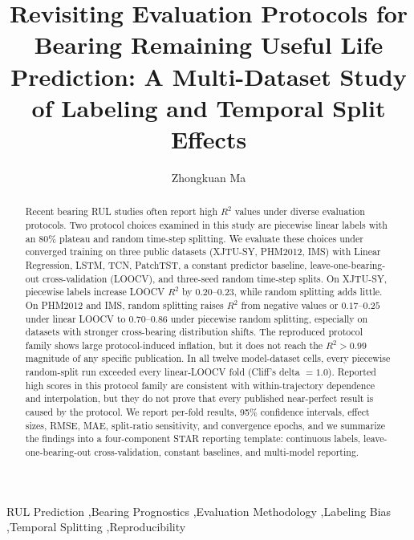 \documentclass[5p,twocolumn]{elsarticle}
\begin{document}
\begin{frontmatter}

\title{Revisiting Evaluation Protocols for Bearing Remaining Useful Life Prediction: A Multi-Dataset Study of Labeling and Temporal Split Effects}

\author[1]{Zhongkuan Ma}

\begin{abstract}
Recent bearing RUL studies often report high $R^2$ values under diverse evaluation protocols. Two protocol choices examined in this study are piecewise linear labels with an 80\% plateau and random time-step splitting. We evaluate these choices under converged training on three public datasets (XJTU-SY, PHM2012, IMS) with Linear Regression, LSTM, TCN, PatchTST, a constant predictor baseline, leave-one-bearing-out cross-validation (LOOCV), and three-seed random time-step splits. On XJTU-SY, piecewise labels increase LOOCV $R^2$ by $0.20$--$0.23$, while random splitting adds little. On PHM2012 and IMS, random splitting raises $R^2$ from negative values or $0.17$--$0.25$ under linear LOOCV to $0.70$--$0.86$ under piecewise random splitting, especially on datasets with stronger cross-bearing distribution shifts. The reproduced protocol family shows large protocol-induced inflation, but it does not reach the $R^2>0.99$ magnitude of any specific publication. In all twelve model-dataset cells, every piecewise random-split run exceeded every linear-LOOCV fold (Cliff's delta $=1.0$). Reported high scores in this protocol family are consistent with within-trajectory dependence and interpolation, but they do not prove that every published near-perfect result is caused by the protocol. We report per-fold results, 95\% confidence intervals, effect sizes, RMSE, MAE, split-ratio sensitivity, and convergence epochs, and we summarize the findings into a four-component STAR reporting template: continuous labels, leave-one-bearing-out cross-validation, constant baselines, and multi-model reporting.
\end{abstract}

\begin{keyword}
RUL Prediction \sep Bearing Prognostics \sep Evaluation Methodology \sep Labeling Bias \sep Temporal Splitting \sep Reproducibility
\end{keyword}

\end{frontmatter}
\end{document}
